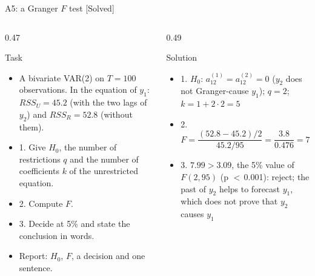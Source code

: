 \begin{frame}{A5: a Granger $F$ test [Solved]}
\itemsize{\scriptsize}
\begin{columns}[T]
\begin{column}{0.47\textwidth}
\begin{block}{Task}
\begin{itemize}
    \item A bivariate VAR(2) on $T = 100$ observations. In the equation of $y_1$: $RSS_U = 45.2$ (with the two lags of $y_2$) and $RSS_R = 52.8$ (without them).
    \item 1. Give $H_0$, the number of restrictions $q$ and the number of coefficients $k$ of the unrestricted equation.
    \item 2. Compute $F$.
    \item 3. Decide at 5\% and state the conclusion in words.
    \item Report: $H_0$, $F$, a decision and one sentence.
\end{itemize}
\end{block}
\end{column}
\begin{column}{0.49\textwidth}
\begin{exampleblock}{Solution}
\begin{itemize}
    \item 1. $H_0$: $a_{12}^{(1)} = a_{12}^{(2)} = 0$ ($y_2$ does not Granger-cause $y_1$); $q = 2$; $k = 1 + 2 \cdot 2 = 5$
    \item 2. $F = \dfrac{(52.8 - 45.2)/2}{45.2/95} = \dfrac{3.8}{0.476} = 7.99$
    \item 3. $7.99 > 3.09$, the 5\% value of $F(2, 95)$ (p $<$\,0.001): reject; the past of $y_2$ helps to forecast $y_1$, which does not prove that $y_2$ causes $y_1$
\end{itemize}
\end{exampleblock}
\end{column}
\end{columns}
\end{frame}

